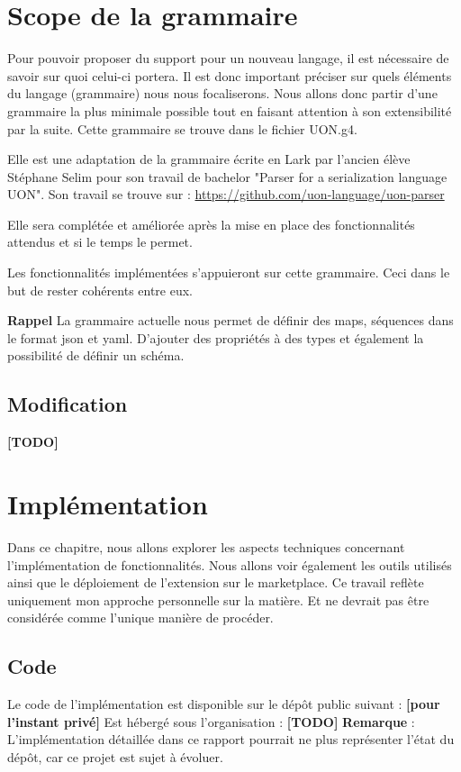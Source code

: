 \documentclass[
    iict, %
    il, %
]{heig-tb}
\begin{document}
\chapter{Scope de la grammaire}
Pour pouvoir proposer du support pour un nouveau langage, il est nécessaire de savoir sur quoi celui-ci portera. Il est donc important préciser sur quels éléments du langage (grammaire) nous nous focaliserons.
Nous allons donc partir d'une grammaire la plus minimale possible tout en faisant attention à son extensibilité par la suite.
Cette grammaire se trouve dans le fichier UON.g4.

Elle est une adaptation de la grammaire écrite en Lark par l'ancien élève Stéphane Selim pour son travail de bachelor "Parser for a serialization language UON". Son travail se trouve sur :
\href{https://github.com/uon-language/uon-parser}{https://github.com/uon-language/uon-parser}

Elle sera complétée et améliorée après la mise en place des fonctionnalités attendus et si le temps le permet.

Les fonctionnalités implémentées s'appuieront sur cette grammaire. Ceci dans le but de rester cohérents entre eux.

\textbf{Rappel}
La grammaire actuelle nous permet de définir des maps, séquences dans le format json et yaml. D'ajouter des propriétés à des types et également la possibilité de définir un schéma.

\section{Modification}
\textbf{[TODO]}


\chapter{Implémentation}
Dans ce chapitre, nous allons explorer les aspects techniques concernant l'implémentation de fonctionnalités. Nous allons voir également les outils utilisés ainsi que le déploiement de l'extension sur le marketplace.
Ce travail reflète uniquement mon approche personnelle sur la matière. Et ne devrait pas être considérée comme l'unique manière de procéder.

\section{Code}
Le code de l'implémentation est disponible sur le dépôt public suivant : \textbf{[pour l'instant privé]}
Est hébergé sous l'organisation : \textbf{[TODO]}
\textbf{Remarque} : L'implémentation détaillée dans ce rapport pourrait ne plus représenter l'état du dépôt, car ce projet est sujet à évoluer.
\end{document}
